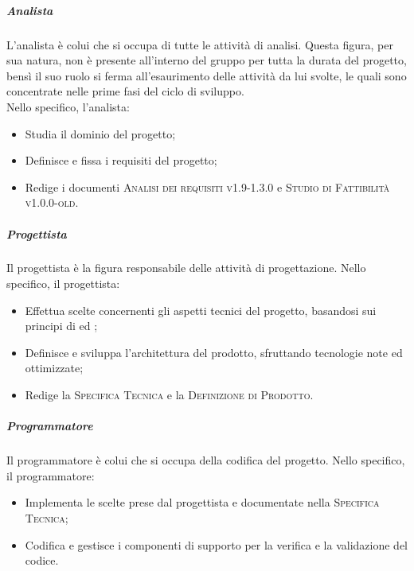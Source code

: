\subparagraph{Analista}
L'analista è colui che si occupa di tutte le attività di analisi. Questa figura, per sua natura, non è presente all'interno del gruppo per tutta la durata del progetto, bensì il suo ruolo si ferma all'esaurimento delle attività da lui svolte, le quali sono concentrate nelle prime fasi del ciclo di sviluppo. \\
Nello specifico, l'analista:
\begin{itemize}
  \item Studia il dominio del progetto;
  \item Definisce e fissa i requisiti del progetto;
  \item Redige i documenti \textsc{Analisi dei requisiti v1.9-1.3.0} e \textsc{Studio di Fattibilità v1.0.0-old}.
\end{itemize}

\subparagraph{Progettista}
Il progettista è la figura responsabile delle attività di progettazione. Nello specifico, il progettista:
\begin{itemize}
  \item Effettua scelte concernenti gli aspetti tecnici del progetto, basandosi sui principi di  ed ;
  \item Definisce e sviluppa l'architettura del prodotto, sfruttando tecnologie note ed ottimizzate;
  \item Redige la \textsc{Specifica Tecnica} e la \textsc{Definizione di Prodotto}.
\end{itemize}

\subparagraph{Programmatore}
Il programmatore è colui che si occupa della codifica del progetto. Nello specifico, il programmatore:
\begin{itemize}
  \item Implementa le scelte prese dal progettista e documentate nella \textsc{Specifica Tecnica};
  \item Codifica e gestisce i componenti di supporto per la verifica e la validazione del codice.
\end{itemize}

